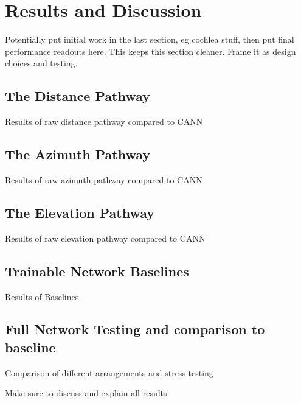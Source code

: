 \chapter{Results and Discussion} \label{ch:results}

Potentially put initial work in the last section, eg cochlea stuff, then put final performance readouts here. This keeps this section cleaner. Frame it as design choices and testing.


\section{The Distance Pathway}

Results of raw distance pathway compared to CANN

\section{The Azimuth Pathway}

Results of raw azimuth pathway compared to CANN

\section{The Elevation Pathway}

Results of raw elevation pathway compared to CANN

\section{Trainable Network Baselines}

Results of Baselines

\section{Full Network Testing and comparison to baseline}

Comparison of different arrangements and stress testing

Make sure to discuss and explain all results








